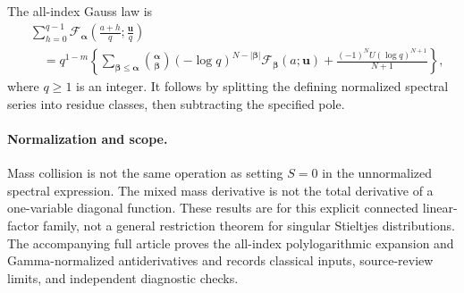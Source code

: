 The all-index Gauss law is
\begin{align}\label{connected:gauss}
 &\sum_{h=0}^{q-1}\mathcal F_{\boldsymbol\alpha}
    \left(\frac{a+h}{q};\frac{\boldsymbol u}{q}\right)\\
 &\quad=q^{1-m}\left\{
 \sum_{\boldsymbol\beta\le\boldsymbol\alpha}
   \binom{\boldsymbol\alpha}{\boldsymbol\beta}
   (-\log q)^{N-|\boldsymbol\beta|}
       \mathcal F_{\boldsymbol\beta}(a;\boldsymbol u)
 +\frac{(-1)^NU(\log q)^{N+1}}{N+1}\right\},\nonumber
\end{align}
where $q\ge1$ is an integer. It follows by splitting the defining normalized
spectral series into residue classes, then subtracting the specified pole.

\paragraph{Normalization and scope.}
Mass collision is not the same operation as setting $S=0$ in the unnormalized
spectral expression. The mixed mass derivative is not the total derivative
of a one-variable diagonal function. These results are for this explicit
connected linear-factor family, not a general restriction theorem for singular
Stieltjes distributions. The accompanying full article proves the all-index
polylogarithmic expansion and Gamma-normalized antiderivatives and records
classical inputs, source-review limits, and independent diagnostic checks.
